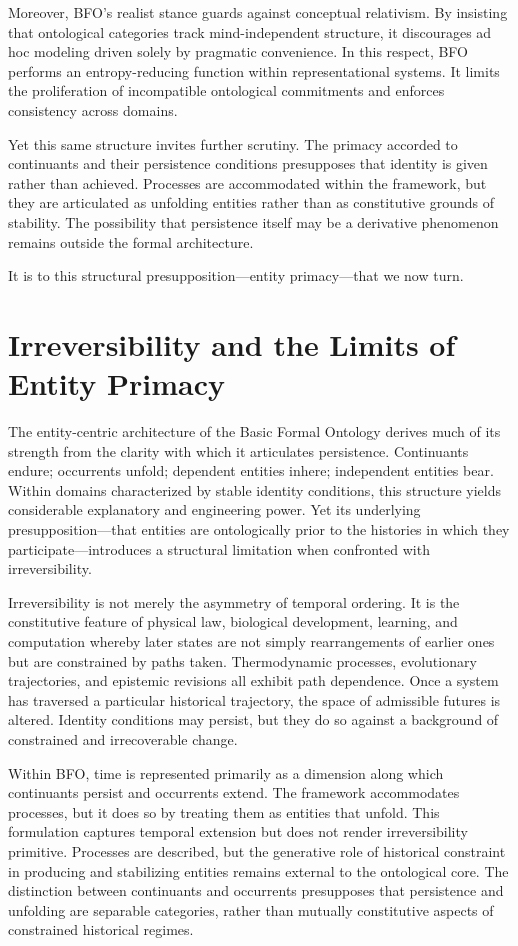 \documentclass[12pt]{article}
\begin{document}
Moreover, BFO’s realist stance guards against conceptual relativism. By insisting that ontological categories track mind-independent structure, it discourages ad hoc modeling driven solely by pragmatic convenience. In this respect, BFO performs an entropy-reducing function within representational systems. It limits the proliferation of incompatible ontological commitments and enforces consistency across domains.

Yet this same structure invites further scrutiny. The primacy accorded to continuants and their persistence conditions presupposes that identity is given rather than achieved. Processes are accommodated within the framework, but they are articulated as unfolding entities rather than as constitutive grounds of stability. The possibility that persistence itself may be a derivative phenomenon remains outside the formal architecture.

It is to this structural presupposition—entity primacy—that we now turn.

\section{Irreversibility and the Limits of Entity Primacy}

The entity-centric architecture of the Basic Formal Ontology derives much of its strength from the clarity with which it articulates persistence. Continuants endure; occurrents unfold; dependent entities inhere; independent entities bear. Within domains characterized by stable identity conditions, this structure yields considerable explanatory and engineering power. Yet its underlying presupposition—that entities are ontologically prior to the histories in which they participate—introduces a structural limitation when confronted with irreversibility.

Irreversibility is not merely the asymmetry of temporal ordering. It is the constitutive feature of physical law, biological development, learning, and computation whereby later states are not simply rearrangements of earlier ones but are constrained by paths taken. Thermodynamic processes, evolutionary trajectories, and epistemic revisions all exhibit path dependence. Once a system has traversed a particular historical trajectory, the space of admissible futures is altered. Identity conditions may persist, but they do so against a background of constrained and irrecoverable change.

Within BFO, time is represented primarily as a dimension along which continuants persist and occurrents extend. The framework accommodates processes, but it does so by treating them as entities that unfold. This formulation captures temporal extension but does not render irreversibility primitive. Processes are described, but the generative role of historical constraint in producing and stabilizing entities remains external to the ontological core. The distinction between continuants and occurrents presupposes that persistence and unfolding are separable categories, rather than mutually constitutive aspects of constrained historical regimes.
\end{document}
